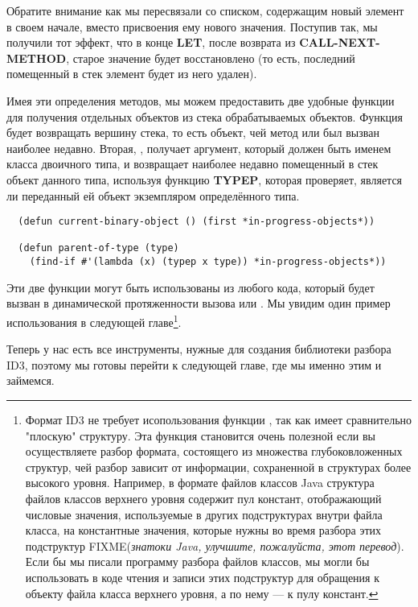 Обратите внимание как мы пересвязали  со списком, содержащим
новый элемент в своем начале, вместо присвоения ему нового значения. Поступив так, мы
получили тот эффект, что в конце \textbf{LET}, после возврата из
\textbf{CALL-NEXT-METHOD}, старое значение  будет
восстановлено (то есть, последний помещенный в стек элемент будет из него удален).

Имея эти определения методов, мы можем предоставить две удобные функции для получения
отдельных объектов из стека обрабатываемых объектов. Функция 
будет возвращать вершину стека, то есть объект, чей метод  или
 был вызван наиболее недавно. Вторая, , получает
аргумент, который должен быть именем класса двоичного типа, и возвращает наиболее недавно
помещенный в стек объект данного типа, используя функцию \textbf{TYPEP}, которая
проверяет, является ли переданный ей объект экземпляром определённого типа.

\begin{lstlisting}
  (defun current-binary-object () (first *in-progress-objects*))

  (defun parent-of-type (type)
    (find-if #'(lambda (x) (typep x type)) *in-progress-objects*))
\end{lstlisting}

Эти две функции могут быть использованы из любого кода, который будет вызван в
динамической протяженности вызова  или . Мы увидим
один пример использования  в следующей главе\footnote{Формат
  ID3 не требует исопользования функции , так как имеет сравнительно
  "плоскую" структуру. Эта функция становится очень полезной если вы осуществляете разбор
  формата, состоящего из множества глубоковложенных структур, чей разбор зависит от
  информации, сохраненной в структурах более высокого уровня. Например, в формате файлов
  классов Java структура файлов классов верхнего уровня содержит пул констант,
  отображающий числовые значения, используемые в других подструктурах внутри файла класса,
  на константные значения, которые нужны во время разбора этих подструктур
  FIXME(\textit{знатоки Java, улучшите, пожалуйста, этот перевод}). Если бы мы писали
  программу разбора файлов классов, мы могли бы использовать  в коде
  чтения и записи этих подструктур для обращения к объекту файла класса верхнего уровня, а
  по нему --- к пулу констант.}.

Теперь у нас есть все инструменты, нужные для создания библиотеки разбора ID3, поэтому мы
готовы перейти к следующей главе, где мы именно этим и займемся.

